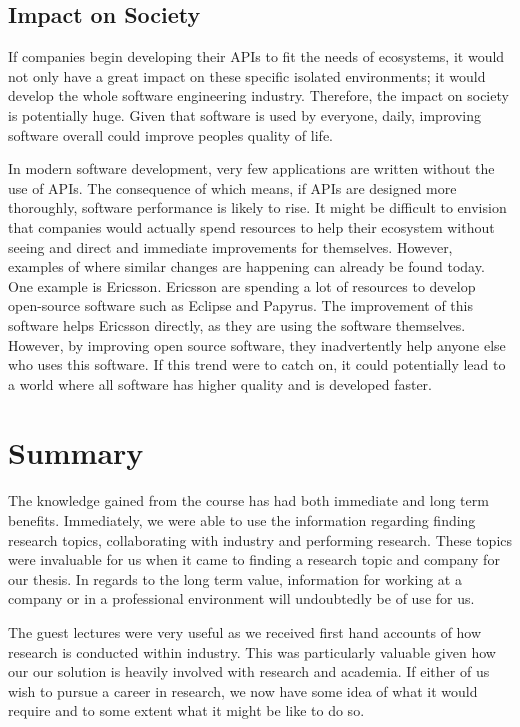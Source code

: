 \documentclass{article}
\begin{document}
\subsection{Impact on Society}
If companies begin developing their APIs to fit the needs of ecosystems, it would not only have a great impact on these specific isolated environments; it would develop the whole software engineering industry. Therefore, the impact on society is potentially huge. Given that software is used by everyone, daily, improving software overall could improve peoples quality of life. \smallskip

In modern software development, very few applications are written without the use of APIs. The consequence of which means, if APIs are designed more thoroughly, software performance is likely to rise. It might be difficult to envision that companies would actually spend resources to help their ecosystem without seeing and direct and immediate improvements for themselves. However, examples of where similar changes are happening can already be found today. One example is Ericsson. Ericsson are spending a lot of resources to develop open-source software such as Eclipse and Papyrus. The improvement of this software helps Ericsson directly, as they are using the software themselves. However, by improving open source software, they inadvertently help anyone else who uses this software. If this trend were to catch on, it could potentially lead to a world where all software has higher quality and is developed faster. 

\section{Summary}
The knowledge gained from the course has had both immediate and long term benefits. Immediately, we were able to use the information regarding finding research topics, collaborating with industry and performing research. These topics were invaluable for us when it came to finding a research topic and company for our thesis. In regards to the long term value, information for working at a company or in a professional environment will undoubtedly be of use for us. \smallskip

The guest lectures were very useful as we received first hand accounts of how research is conducted within industry. This was particularly valuable given how our our solution is heavily involved with research and academia. If either of us wish to pursue a career in research, we now have some idea of what it would require and to some extent what it might be like to do so. \smallskip
\end{document}
